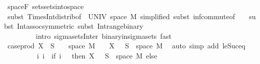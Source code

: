 \begin{isabellebody}
\ space{\isacharunderscore}{\kern0pt}F\ sets{\isachardot}{\kern0pt}sets{\isacharunderscore}{\kern0pt}into{\isacharunderscore}{\kern0pt}space\isanewline
\ \ \ \ \ \ \isamarkupfalse%
\ {\isacharparenleft}{\kern0pt}subst\ Times{\isacharunderscore}{\kern0pt}Int{\isacharunderscore}{\kern0pt}distrib{}{\isacharbrackleft}{\kern0pt}of\ {\isachardoublequoteopen}{\isacharbraceleft}{\kern0pt}{}{\isacharbraceright}{\kern0pt}{\isachardoublequoteclose}\ UNIV\ {\isachardoublequoteopen}space\ M{\isachardoublequoteclose}{\isacharcomma}{\kern0pt}\ simplified{\isacharbrackright}{\kern0pt}{\isacharcomma}{\kern0pt}\ subst\ inf{\isachardot}{\kern0pt}commute{\isacharbrackleft}{\kern0pt}of\ {\isachardoublequoteopen}{\isacharunderscore}{\kern0pt}\ {\isasymtimes}\ {\isacharunderscore}{\kern0pt}{\isachardoublequoteclose}{\isacharbrackright}{\kern0pt}{\isacharcomma}{\kern0pt}\ subst\ Int{\isacharunderscore}{\kern0pt}assoc{\isacharbrackleft}{\kern0pt}symmetric{\isacharbrackright}{\kern0pt}{\isacharcomma}{\kern0pt}\ subst\ Int{\isacharunderscore}{\kern0pt}range{\isacharunderscore}{\kern0pt}binary{\isacharparenright}{\kern0pt}\ \isanewline
\ \ \ \ \ \ \ \ \ {\isacharparenleft}{\kern0pt}intro\ sigma{\isacharunderscore}{\kern0pt}sets{\isacharunderscore}{\kern0pt}Inter\ binary{\isacharunderscore}{\kern0pt}in{\isacharunderscore}{\kern0pt}sigma{\isacharunderscore}{\kern0pt}sets{\isacharcomma}{\kern0pt}\ fast{\isacharparenright}{\kern0pt}{\isacharplus}{\kern0pt}\isanewline
\ \ \ \ \isamarkupfalse%
\ \isamarkupfalse%
\ {\isachardoublequoteopen}case{\isacharunderscore}{\kern0pt}prod\ X\ {\isacharminus}{\kern0pt}{\isacharbackquote}{\kern0pt}\ S\ {\isasyminter}\ {\isacharparenleft}{\kern0pt}{\isacharbraceleft}{\kern0pt}{}{\isacharbraceright}{\kern0pt}\ {\isasymtimes}\ space\ M{\isacharparenright}{\kern0pt}\ {\isacharequal}{\kern0pt}\ {\isacharbraceleft}{\kern0pt}{}{\isacharbraceright}{\kern0pt}\ {\isasymtimes}\ {\isacharparenleft}{\kern0pt}X\ {}\ {\isacharminus}{\kern0pt}{\isacharbackquote}{\kern0pt}\ S\ {\isasyminter}\ space\ M{\isacharparenright}{\kern0pt}{\isachardoublequoteclose}\ \isamarkupfalse%
\ {\isacharparenleft}{\kern0pt}auto\ simp\ add{\isacharcolon}{\kern0pt}\ le{\isacharunderscore}{\kern0pt}Suc{\isacharunderscore}{\kern0pt}eq{\isacharparenright}{\kern0pt}\isanewline
\ \ \ \ \isamarkupfalse%
\ \isamarkupfalse%
\ {\isachardoublequoteopen}{\isachardot}{\kern0pt}{\isachardot}{\kern0pt}{\isachardot}{\kern0pt}\ {\isacharequal}{\kern0pt}\ {\isacharparenleft}{\kern0pt}{\isasymUnion}i{\isachardot}{\kern0pt}\ {\isacharbraceleft}{\kern0pt}i{\isacharbraceright}{\kern0pt}\ {\isasymtimes}\ {\isacharparenleft}{\kern0pt}if\ i\ {\isacharequal}{\kern0pt}\ {}\ then\ X\ {}\ {\isacharminus}{\kern0pt}{\isacharbackquote}{\kern0pt}\ S\ {\isasyminter}\ space\ M\ else\ {\isacharbraceleft}{\kern0pt}{\isacharbraceright}{\kern0pt}{\isacharparenright}{\kern0pt}{\isacharparenright}{\kern0pt}{\isachardoublequoteclose}\ \isamarkupfalse%

\end{isabellebody}
